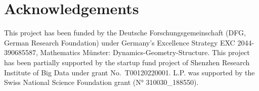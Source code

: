 \section{Acknowledgements}
This project has been funded by the Deutsche Forschungsgemeinschaft (DFG, German Research Foundation) under Germany's Excellence Strategy EXC 2044-390685587, Mathematics M{\"u}nster: Dynamics-Geometry-Structure.
This project has been partially supported by the startup fund project of Shenzhen Research Institute of Big Data under grant No.~T00120220001.
L.P. was supported by the Swiss National Science Foundation grant (N° 310030\_188550).